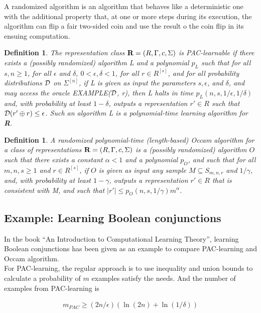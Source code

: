 \documentclass[12pt]{article}
\newtheorem{definition}[theorem]{Definition}
\newcommand{\cald}{{\cal D}}
\begin{document}
A randomized algorithm is an algorithm that behaves like a
deterministic one with the additional property that, at one or more
steps during its execution, the algorithm can flip a fair two-sided
coin and use the result o the coin flip in its ensuing computation.

\begin{definition}
The representation class ${\bf R} = (R, \Gamma, c, \Sigma)$ is
PAC-learnable if there exists a (possibly randomized) algorithm L and
a polynomial $p_L$ such that for all $s, n \ge 1$, for all $\epsilon$
and $\delta$, $0 < \epsilon, \delta < 1$, for all $r \in R^{[s]}$, and
for all probability distributions $\cald$ on $\Sigma^{[n]}$, if L is
given as input the parameters $s, \epsilon$, and $\delta$, and may
access the oracle EXAMPLE($\cald$, r), then L halts in time $p_L(n, s,
1/\epsilon, 1/\delta)$ and, with probability at least $1 - \delta$,
outputs a representation $r' \in R$ such that $\cald (r' \oplus r) \le 
\epsilon$. Such an algorithm L is a polynomial-time learning algorithm
for {\bf R}.
\end{definition}

\begin{definition}
A randomized polynomial-time (length-based) Occam algorithm for a
class of representations ${\bf R} = (R, \Gamma, c, \Sigma)$ is a
(possibly randomized) algorithm $O$ such that there exists a constant
$\alpha < 1$ and a polynomial $p_O$, and such that for all $m, n, s
\ge 1$ and $r \in R^{[s]}$, if $O$ is given as input any sample $M
\subseteq S_{m,n,r}$ and $1 / \gamma$, and, with probability at least
$1 - \gamma$, outputs a representation $r' \in R$ that is consistent
with M, and such that $|r'| \le p_O(n, s, 1 / \gamma)m^{\alpha}$.
\end{definition}

\subsection{Example: Learning Boolean conjunctions}

In the book ``An Introduction to Computational Learning Theory'',
learning Boolean conjunctions has been given as an example to compare
PAC-learning and Occam algorithm. \\

For PAC-learning, the regular approach is to use inequality and union
bounds to calculate a probability of $m$ examples satisfy the
needs. And the number of examples from PAC-learning is

\begin{eqnarray*}
m_{PAC} \ge (2n / \epsilon) (\ln {(2n)} + \ln {(1 / \delta)})
\end{eqnarray*}
\end{document}
